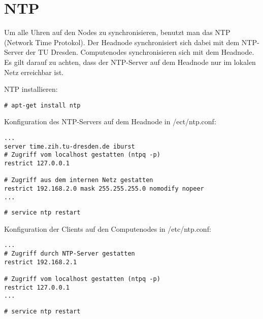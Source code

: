 \chapter{NTP}
Um alle Uhren auf den Nodes zu synchronisieren, benutzt man das NTP
(Network Time Protokol).
Der Headnode synchronisiert sich dabei mit dem NTP-Server der TU Dresden.
Computenodes synchronisieren sich mit dem Headnode. Es gilt darauf zu achten,
dass der NTP-Server auf dem Headnode nur im lokalen Netz erreichbar ist.

NTP installieren:
\begin{lstlisting}[style=Bash]
# apt-get install ntp
\end{lstlisting}
Konfiguration des NTP-Servers auf dem Headnode in /ect/ntp.conf:
\begin{lstlisting}[style=Bash]
...
server time.zih.tu-dresden.de iburst
# Zugriff vom localhost gestatten (ntpq -p)
restrict 127.0.0.1
 
# Zugriff aus dem internen Netz gestatten
restrict 192.168.2.0 mask 255.255.255.0 nomodify nopeer
...
\end{lstlisting}
\begin{lstlisting}[style=Bash]
# service ntp restart
\end{lstlisting}
Konfiguration der Clients auf den Computenodes in /etc/ntp.conf:
\begin{lstlisting}[style=Bash]
...
# Zugriff durch NTP-Server gestatten
restrict 192.168.2.1
 
# Zugriff vom localhost gestatten (ntpq -p)
restrict 127.0.0.1
...
\end{lstlisting}
\begin{lstlisting}[style=Bash]
# service ntp restart
\end{lstlisting}
